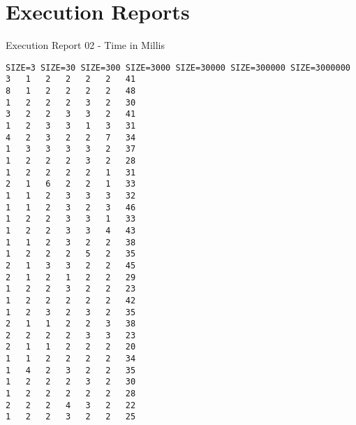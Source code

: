 \apendice
\chapter{Execution Reports}
\label{executionreport02}

Execution Report 02 - Time in Millis
\begin{lstlisting}
SIZE=3 SIZE=30 SIZE=300 SIZE=3000 SIZE=30000 SIZE=300000 SIZE=3000000
3	1	2	2	2	2	41
8	1	2	2	2	2	48
1	2	2	2	3	2	30
3	2	2	3	3	2	41
1	2	3	3	1	3	31
4	2	3	2	2	7	34
1	3	3	3	3	2	37
1	2	2	2	3	2	28
1	2	2	2	2	1	31
2	1	6	2	2	1	33
1	1	2	3	3	3	32
1	1	2	3	2	3	46
1	2	2	3	3	1	33
1	2	2	3	3	4	43
1	1	2	3	2	2	38
1	2	2	2	5	2	35
2	1	3	3	2	2	45
2	1	2	1	2	2	29
1	2	2	3	2	2	23
1	2	2	2	2	2	42
1	2	3	2	3	2	35
2	1	1	2	2	3	38
2	2	2	2	3	3	23
2	1	1	2	2	2	20
1	1	2	2	2	2	34
1	4	2	3	2	2	35
1	2	2	2	3	2	30
1	2	2	2	2	2	28
2	2	2	4	3	2	22
1	2	2	3	2	2	25
\end{lstlisting}